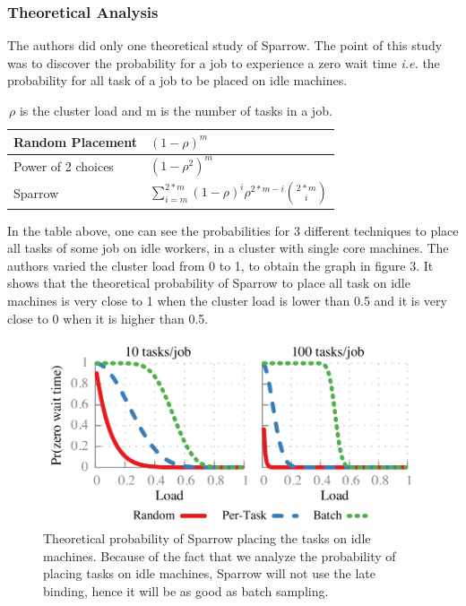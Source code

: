 \documentclass[11pt]{article}
\begin{document}
		\subsubsection*{Theoretical Analysis}
			\label{theoreticalanalysis}
        
        	The authors did only one theoretical study of Sparrow. The point of this study was to discover the probability for a job to experience a zero wait time \textit{i.e.} the probability for all task of a job to be placed on idle machines.
            
            \begin{table}
            	\caption{$\rho$ is the cluster load and m is the number of tasks in a job.}	
            		\centering
                \begin{tabular}{ | l | l |}
                    \hline
                    Random Placement & $(1-\rho)^m$  \\ \hline
                    Power of 2 choices & $(1-\rho^2)^m$  \\ \hline
                    Sparrow & $\sum_{i=m}^{2*m}(1-\rho)^i$$\rho^{2*m-i}$${2*m}\choose{i}$ \\
                    \hline
                \end{tabular}
        	\end{table}
            
            In the table above, one can see the probabilities for 3 different techniques to place all tasks of some job on idle workers, in a cluster with single core machines. The authors varied the cluster load from 0 to 1, to obtain the graph in figure 3. It shows that the theoretical probability of Sparrow to place all task on idle machines is very close to 1 when the cluster load is lower than 0.5 and it is very close to 0 when it is higher than 0.5.
            
            \begin{figure}
            		\centering
            		\includegraphics[scale=.3]{fig3}
            		\caption{Theoretical probability of Sparrow placing the tasks on idle machines. Because of the fact that we analyze the probability of placing tasks on idle machines, Sparrow will not use the late binding, hence it will be as good as batch sampling.}
            		\label{fig3}
            \end{figure}
         
\end{document}
